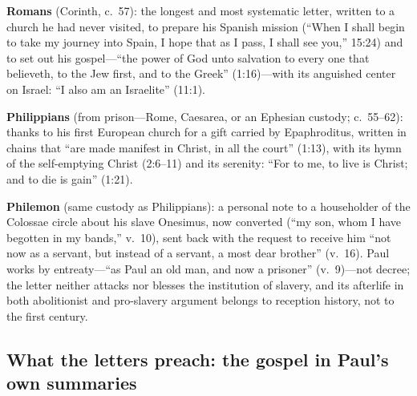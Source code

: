 \textbf{Romans} (Corinth, c.~57): the longest and most systematic letter,
written to a church he had never visited, to prepare his Spanish mission
(``When I shall begin to take my journey into Spain, I hope that as I
pass, I shall see you,'' 15:24) and to set out his gospel---``the power of
God unto salvation to every one that believeth, to the Jew first, and to
the Greek'' (1:16)---with its anguished center on Israel: ``I also am an
Israelite'' (11:1).

\textbf{Philippians} (from prison---Rome, Caesarea, or an Ephesian
custody; c.~55--62): thanks to his first European church for a gift
carried by Epaphroditus, written in chains that ``are made manifest in
Christ, in all the court'' (1:13), with its hymn of the self-emptying
Christ (2:6--11) and its serenity: ``For to me, to live is Christ; and to
die is gain'' (1:21).

\textbf{Philemon} (same custody as Philippians): a personal note to a
householder of the Colossae circle about his slave Onesimus, now converted
(``my son, whom I have begotten in my bands,'' v.~10), sent back with the
request to receive him ``not now as a servant, but instead of a servant,
a most dear brother'' (v.~16). Paul works by entreaty---``as Paul an old
man, and now a prisoner'' (v.~9)---not decree; the letter neither attacks
nor blesses the institution of slavery, and its afterlife in both
abolitionist and pro-slavery argument belongs to reception history, not
to the first century.

\subsection{What the letters preach: the gospel in Paul's own summaries}

